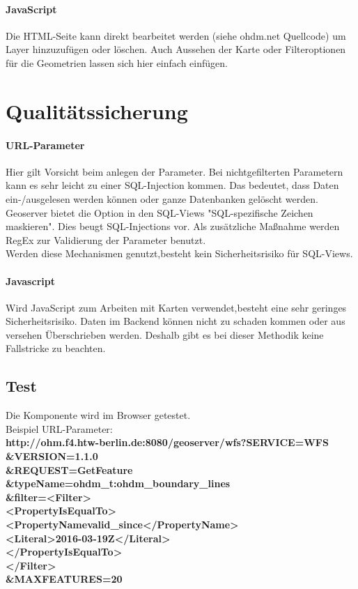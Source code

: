 \paragraph{JavaScript}
Die HTML-Seite kann direkt bearbeitet werden (siehe ohdm.net Quellcode) um Layer hinzuzuf\"ugen oder l\"oschen. Auch Aussehen der Karte oder Filteroptionen f\"ur die Geometrien lassen sich hier einfach einf\"ugen.\\
\section{Qualit\"atssicherung}

\paragraph{URL-Parameter}
Hier gilt Vorsicht beim anlegen der Parameter. Bei nichtgefilterten Parametern kann es sehr leicht zu einer SQL-Injection kommen. Das bedeutet, dass Daten ein-/ausgelesen werden k\"onnen oder ganze Datenbanken gel\"oscht werden. Geoserver bietet die Option in den SQL-Views "SQL-spezifische Zeichen maskieren". Dies beugt SQL-Injections vor. Als zus\"atzliche Maßnahme werden RegEx zur Validierung der Parameter benutzt.\\
Werden diese Mechanismen genutzt,besteht kein Sicherheitsrisiko für SQL-Views.\\

\paragraph{Javascript}
Wird JavaScript zum Arbeiten mit Karten verwendet,besteht eine sehr geringes Sicherheitsrisiko. Daten im Backend können nicht zu schaden kommen oder aus versehen Überschrieben werden. Deshalb gibt es bei dieser Methodik keine Fallstricke zu beachten. 

\subsection{Test}
Die Komponente wird im Browser getestet.\\
Beispiel URL-Parameter:\\
\textbf{http://ohm.f4.htw-berlin.de:8080/geoserver/wfs?SERVICE=WFS\\
\&VERSION=1.1.0\\
\&REQUEST=GetFeature\\
\&typeName=ohdm\_t:ohdm\_boundary\_lines\\
\&filter=\textless Filter\textgreater \\
 \textless PropertyIsEqualTo\textgreater \\
\textless PropertyNamevalid\_since\textless /PropertyName\textgreater\\
\textless Literal\textgreater 2016-03-19Z\textless /Literal\textgreater \\
\textless /PropertyIsEqualTo\textgreater \\
\textless /Filter\textgreater\\
\&MAXFEATURES=20\\}\\


